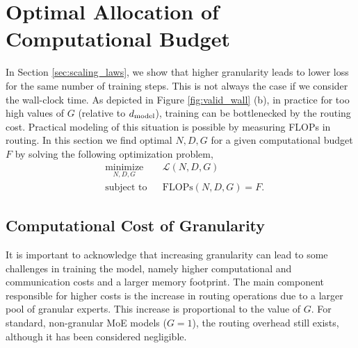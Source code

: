 \section{Optimal Allocation of Computational Budget }\label{sec:scaling_app}

In Section \ref{sec:scaling_laws}, we show that higher granularity leads to lower loss for the same number of training steps. This is not always the case if we consider the wall-clock time. As depicted in Figure \ref{fig:valid_wall} (b), in practice for too high values of $G$ (relative to $d_\text{model}$), training can be bottlenecked by the routing cost. Practical modeling of this situation is possible by measuring FLOPs in routing.
In this section we find optimal $N,D,G$ for a given computational budget $F$ 
by solving the following optimization problem,
\begin{equation*}
    \begin{aligned}
        & \underset{N, D, G}{\text{minimize}}
        & & \mathcal{L}(N, D, G) \\
        & \text{subject to}
        & & \text{FLOPs}(N, D, G) = F.
    \end{aligned}
\end{equation*}


\subsection{Computational Cost of Granularity} \label{sub:compute_optimal}


It is important to acknowledge that increasing granularity can lead to some challenges in training the model, namely higher computational and communication costs and a larger memory footprint. The main component responsible for higher costs is the increase in routing operations due to a larger pool of granular experts. This increase is proportional to the value of $G.$ For standard, non-granular MoE models ($G=1$), the routing overhead still exists, although it has been considered negligible. 

